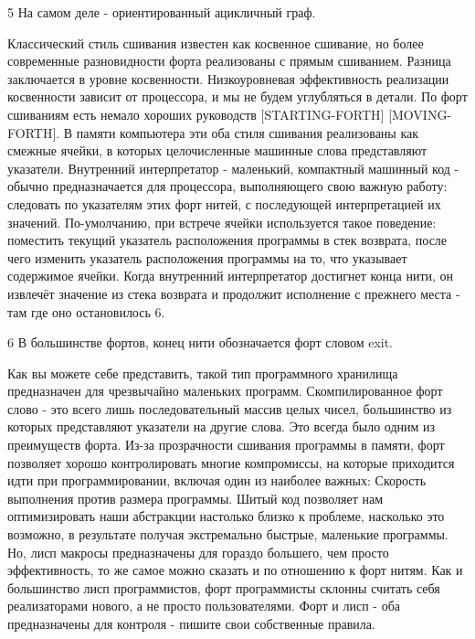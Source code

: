 5 На самом деле - ориентированный ацикличный граф.

Классический стиль сшивания известен как косвенное сшивание, но более современные разновидности форта реализованы с прямым сшиванием. Разница заключается в уровне косвенности. Низкоуровневая эффективность реализации косвенности зависит от процессора, и мы не будем углубляться в детали. По форт сшиваниям есть немало хороших руководств [STARTING-FORTH] [MOVING-FORTH]. В памяти компьютера эти оба стиля сшивания реализованы как смежные ячейки, в которых целочисленные машинные слова представляют указатели. Внутренний интерпретатор - маленький, компактный машинный код - обычно предназначается для процессора, выполняющего свою важную работу: следовать по указателям этих форт нитей, с последующей интерпретацией их значений. По-умолчанию, при встрече ячейки используется такое поведение: поместить текущий указатель расположения программы в стек возврата, после чего изменить указатель расположения программы на то, что указывает содержимое ячейки. Когда внутренний интерпретатор достигнет конца нити, он извлечёт значение из стека возврата и продолжит исполнение с прежнего места - там где оно остановилось 6.

6 В большинстве фортов, конец нити обозначается форт словом exit.

Как вы можете себе представить, такой тип программного хранилища предназначен для чрезвычайно маленьких программ. Скомпилированное форт слово - это всего лишь последовательный массив целых чисел, большинство из которых представляют указатели на другие слова. Это всегда было одним из преимуществ форта. Из-за прозрачности сшивания программы в памяти, форт позволяет хорошо контролировать многие компромиссы, на которые приходится идти при программировании, включая один из наиболее важных: Скорость выполнения против размера программы. Шитый код позволяет нам оптимизировать наши абстракции настолько близко к проблеме, насколько это возможно, в результате получая экстремально быстрые, маленькие программы. Но, лисп макросы предназначены для гораздо большего, чем просто эффективность, то же самое можно сказать и по отношению к форт нитям. Как и большинство лисп программистов, форт программисты склонны считать себя реализаторами нового, а не просто пользователями. Форт и лисп - оба предназначены для контроля - пишите свои собственные правила.

